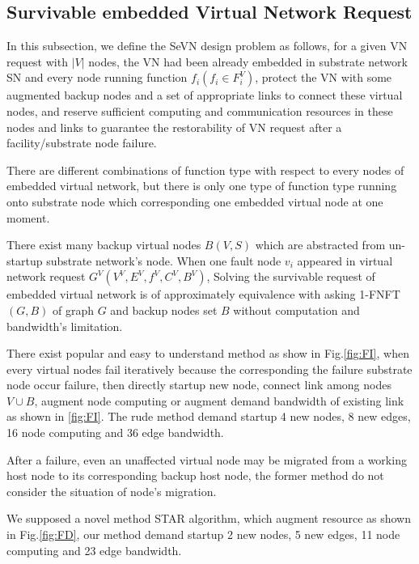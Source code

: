 

\subsection{Survivable embedded Virtual Network Request}

In this subsection, we define the SeVN design problem as follows, for a given VN request with $|V|$ nodes, the VN had been already embedded in substrate network SN and every node running function $f_i(f_i\in F^V_i)$, protect the VN with some augmented backup nodes and a set of appropriate links to connect these virtual nodes, and reserve sufficient computing and communication resources in these nodes and links to guarantee the restorability of VN request after a facility/substrate node failure.

There are different combinations of function type with respect to  every nodes of embedded virtual network, but there is only one type of function type running onto substrate node which corresponding one embedded virtual node at one moment.

There exist many backup virtual nodes $B(V,S)$ which are abstracted from un-startup substrate network's node. When one fault node $v_i$ appeared in virtual network request $G^V (V^V,E^V,f^V,C^V,B^V)$, Solving the survivable request of embedded virtual network is of approximately equivalence with asking 1-FNFT$(G,B)$ of graph $G$ and backup nodes set $B$ without computation and bandwidth's limitation.

There exist popular and easy to understand method\cite{yeow2011designing} as show in Fig.\ref{fig:FI}, when every virtual nodes fail iteratively because the corresponding the failure substrate node occur failure, then directly startup new node, connect link among nodes $V\cup B$, augment node computing or augment demand bandwidth of existing link as shown in \ref{fig:FI}. The rude method demand startup 4 new nodes, 8 new edges, 16 node computing and 36 edge bandwidth.

After a failure, even an unaffected virtual node may be migrated from a working host node to its corresponding backup host node, the former method\cite{yeow2011designing} do not consider the situation of node's migration.


We supposed a novel method STAR algorithm, which augment resource as shown in Fig.\ref{fig:FD}, our method demand startup 2 new nodes, 5 new edges, 11 node computing and 23 edge bandwidth.


